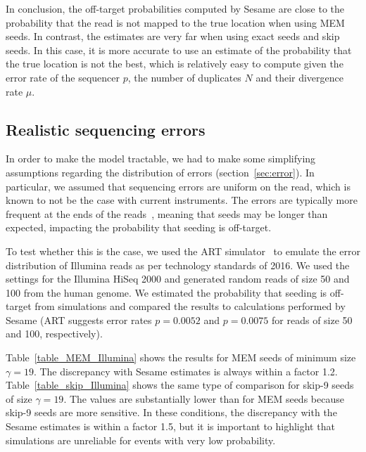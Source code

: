 \documentclass{article}
\begin{document}
In conclusion, the off-target probabilities computed by Sesame are close
to the probability that the read is not mapped to the true location when
using MEM seeds. In contrast, the estimates are very far when using exact
seeds and skip seeds. In this case, it is more accurate to use an estimate
of the probability that the true location is not the best, which is
relatively easy to compute given the error rate of the sequencer $p$, the
number of duplicates $N$ and their divergence rate $\mu$.


\subsection{Realistic sequencing errors}

In order to make the model tractable, we had to make some simplifying
assumptions regarding the distribution of errors
(section~\ref{sec:error}). In particular, we assumed that sequencing
errors are uniform on the read, which is known to not be the case with
current instruments. The errors are typically more frequent at the ends of
the reads~\cite{pmid21576222}, meaning that seeds may be longer than
expected, impacting the probability that seeding is off-target.

To test whether this is the case, we used the ART
simulator~\cite{pmid22199392} to emulate the error distribution of
Illumina reads as per technology standards of 2016. We used the settings
for the Illumina HiSeq 2000 and generated random reads of size 50 and 100
from the human genome. We estimated the probability that seeding is
off-target from simulations and compared the results to calculations
performed by Sesame (ART suggests error rates $p=0.0052$ and $p=0.0075$
for reads of size 50 and 100, respectively).

Table~\ref{table_MEM_Illumina} shows the results for MEM seeds of minimum
size $\gamma=19$. The discrepancy with Sesame estimates is always within a
factor 1.2. Table~\ref{table_skip_Illumina} shows the same type of
comparison for skip-9 seeds of size $\gamma=19$. The values are
substantially lower than for MEM seeds because skip-9 seeds are more
sensitive. In these conditions, the discrepancy with the Sesame estimates
is within a factor 1.5, but it is important to highlight that simulations
are unreliable for events with very low probability.
\end{document}
